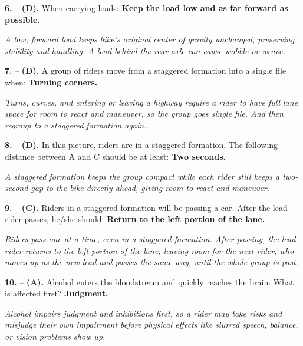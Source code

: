 \begin{minipage}{\linewidth}
\noindent\textbf{6.}  -- \textbf {(D).} When carrying loads:  \textbf {Keep the load low and as far forward as possible.} \par \textit {A low, forward load keeps bike's original center of gravity unchanged, preserving stability and handling. A load behind the rear axle can cause wobble or weave.} \\
\end{minipage}

\begin{minipage}{\linewidth}
\noindent\textbf{7.}  -- \textbf {(D).} A group of riders move from a staggered formation into a single file when:  \textbf {Turning corners.} \par \textit {Turns, curves, and entering or leaving a highway require a rider to have full lane space for room to react and maneuver, so the group goes single file. And then regroup to a staggered formation again.} \\
\end{minipage}

\begin{minipage}{\linewidth}
\noindent\textbf{8.}  -- \textbf {(D).} In this picture, riders are in a staggered formation. The following distance between A and C should be at least:  \textbf {Two seconds.} \par \textit {A staggered formation keeps the group compact while each rider still keeps a two-second gap to the bike directly ahead, giving room to react and maneuver.} \\
\end{minipage}

\begin{minipage}{\linewidth}
\noindent\textbf{9.}  -- \textbf {(C).} Riders in a staggered formation will be passing a car. After the lead rider passes, he/she should:  \textbf {Return to the left portion of the lane.} \par \textit {Riders pass one at a time, even in a staggered formation. After passing, the lead rider returns to the left portion of the lane, leaving room for the next rider, who moves up as the new lead and passes the same way, until the whole group is past.} \\
\end{minipage}

\begin{minipage}{\linewidth}
\noindent\textbf{10.}  -- \textbf {(A).} Alcohol enters the bloodstream and quickly reaches the brain. What is affected first?  \textbf {Judgment.} \par \textit {Alcohol impairs judgment and inhibitions first, so a rider may take risks and misjudge their own impairment before physical effects like slurred speech, balance, or vision problems show up.} \\
\end{minipage}

